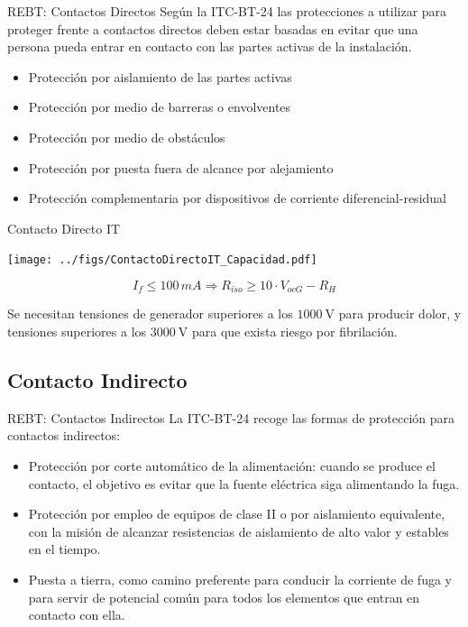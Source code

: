 \documentclass[aspectratio=169, usenames,svgnames,dvipsnames]{beamer}
\begin{document}
\begin{frame}[label={sec:orgb1838c3}]{REBT: Contactos Directos}
Según la ITC-BT-24 las protecciones a utilizar para proteger frente a
contactos directos deben estar \alert{basadas en evitar que una persona pueda
entrar en contacto con las partes activas} de la instalación.

\begin{itemize}
\item Protección por \alert{aislamiento de las partes activas}

\item Protección por medio de \alert{barreras o envolventes}

\item Protección por medio de \alert{obstáculos}

\item Protección por puesta \alert{fuera de alcance} por alejamiento

\item Protección complementaria por \alert{dispositivos de corriente
diferencial}-residual
\end{itemize}
\end{frame}


\begin{frame}[label={sec:org62bff81}]{Contacto Directo IT}
\begin{center}
\texttt{[image: ../figs/ContactoDirectoIT\_Capacidad.pdf]}
\end{center}

$$I_{f}\leq100\, mA\Longrightarrow R_{iso}\geq10\cdot V_{ocG}-R_{H}$$

Se necesitan tensiones de generador superiores a los \(\SI{1000}{\volt}\)
para producir dolor, y tensiones superiores a los \(\SI{3000}{\volt}\)
para que exista riesgo por fibrilación.
\end{frame}

\subsection{Contacto Indirecto}
\label{sec:org494ee88}


\begin{frame}[label={sec:org90c24ed}]{REBT: Contactos Indirectos}
La ITC-BT-24 recoge las formas de protección para contactos
indirectos:

\begin{itemize}
\item Protección por \alert{corte automático de la alimentación}: cuando se
produce el contacto, el objetivo es evitar que la fuente eléctrica
siga alimentando la fuga.

\item Protección por empleo de \alert{equipos de clase II o por aislamiento
equivalente}, con la misión de alcanzar resistencias de aislamiento
de alto valor y estables en el tiempo.

\item \alert{Puesta a tierra}, como camino preferente para conducir la corriente
de fuga y para servir de potencial común para todos los elementos que
entran en contacto con ella.
\end{itemize}
\end{frame}
\end{document}
